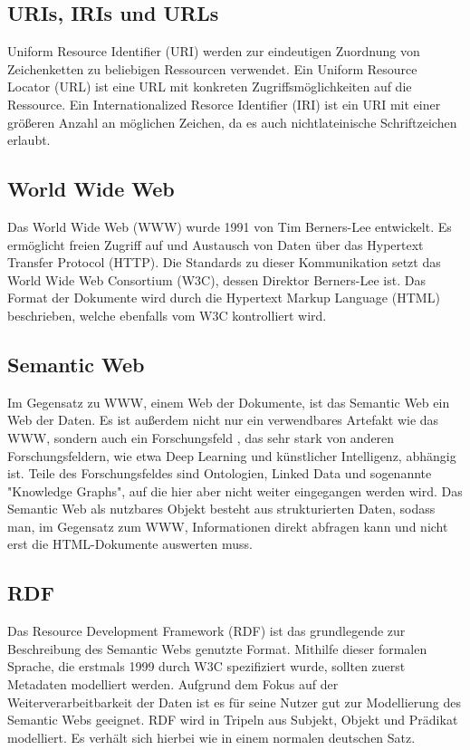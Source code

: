 \subsection{URIs, IRIs und URLs}
Uniform Resource Identifier (URI) werden zur eindeutigen Zuordnung von Zeichenketten zu beliebigen Ressourcen verwendet. \citep{uri}
Ein Uniform Resource Locator (URL) ist eine URL mit konkreten Zugriffsmöglichkeiten auf die Ressource. \citep{url}
Ein Internationalized Resorce Identifier (IRI) ist ein URI mit einer größeren Anzahl an möglichen Zeichen, da es auch nichtlateinische Schriftzeichen erlaubt.

\subsection{World Wide Web}
Das World Wide Web (WWW) wurde 1991 von Tim Berners-Lee entwickelt.
Es ermöglicht freien Zugriff auf und Austausch von Daten über das Hypertext Transfer Protocol (HTTP).
Die Standards zu dieser Kommunikation setzt das World Wide Web Consortium (W3C), dessen Direktor Berners-Lee ist.
Das Format der Dokumente wird durch die Hypertext Markup Language (HTML) beschrieben, welche ebenfalls vom W3C kontrolliert wird. \citep{www}

\subsection{Semantic Web}
Im Gegensatz zu WWW, einem Web der Dokumente, ist das Semantic Web ein Web der Daten.
Es ist außerdem nicht nur ein verwendbares Artefakt wie das WWW, sondern auch ein Forschungsfeld \citep{semanticwebreview}, das sehr stark von anderen Forschungsfeldern, wie etwa Deep Learning und künstlicher Intelligenz, abhängig ist. Teile des Forschungsfeldes sind Ontologien, Linked Data und sogenannte "Knowledge Graphs", auf die hier aber nicht weiter eingegangen werden wird.
Das Semantic Web als nutzbares Objekt besteht aus strukturierten Daten, sodass man, im Gegensatz zum WWW, Informationen direkt abfragen kann und nicht erst die HTML-Dokumente auswerten muss.

\subsection{RDF}
Das Resource Development Framework (RDF) ist das grundlegende zur Beschreibung des Semantic Webs genutzte Format. \citep[S.~35]{bb}
Mithilfe dieser formalen Sprache, die erstmals 1999 durch W3C spezifiziert wurde, sollten zuerst Metadaten modelliert werden.
Aufgrund dem Fokus auf der Weiterverarbeitbarkeit der Daten ist es für seine Nutzer gut zur Modellierung des Semantic Webs geeignet.
RDF wird in Tripeln aus Subjekt, Objekt und Prädikat modelliert. Es verhält sich hierbei wie in einem normalen deutschen Satz.

